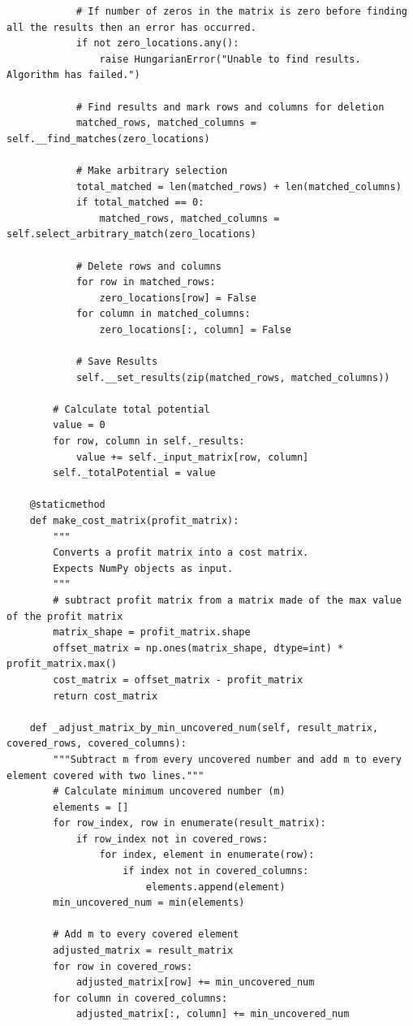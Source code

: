 \documentclass[12pt, letterpaper, twoside]{book}
\begin{document}
\begin{lstlisting}
            # If number of zeros in the matrix is zero before finding all the results then an error has occurred.
            if not zero_locations.any():
                raise HungarianError("Unable to find results. Algorithm has failed.")

            # Find results and mark rows and columns for deletion
            matched_rows, matched_columns = self.__find_matches(zero_locations)

            # Make arbitrary selection
            total_matched = len(matched_rows) + len(matched_columns)
            if total_matched == 0:
                matched_rows, matched_columns = self.select_arbitrary_match(zero_locations)

            # Delete rows and columns
            for row in matched_rows:
                zero_locations[row] = False
            for column in matched_columns:
                zero_locations[:, column] = False

            # Save Results
            self.__set_results(zip(matched_rows, matched_columns))

        # Calculate total potential
        value = 0
        for row, column in self._results:
            value += self._input_matrix[row, column]
        self._totalPotential = value

    @staticmethod
    def make_cost_matrix(profit_matrix):
        """
        Converts a profit matrix into a cost matrix.
        Expects NumPy objects as input.
        """
        # subtract profit matrix from a matrix made of the max value of the profit matrix
        matrix_shape = profit_matrix.shape
        offset_matrix = np.ones(matrix_shape, dtype=int) * profit_matrix.max()
        cost_matrix = offset_matrix - profit_matrix
        return cost_matrix

    def _adjust_matrix_by_min_uncovered_num(self, result_matrix, covered_rows, covered_columns):
        """Subtract m from every uncovered number and add m to every element covered with two lines."""
        # Calculate minimum uncovered number (m)
        elements = []
        for row_index, row in enumerate(result_matrix):
            if row_index not in covered_rows:
                for index, element in enumerate(row):
                    if index not in covered_columns:
                        elements.append(element)
        min_uncovered_num = min(elements)

        # Add m to every covered element
        adjusted_matrix = result_matrix
        for row in covered_rows:
            adjusted_matrix[row] += min_uncovered_num
        for column in covered_columns:
            adjusted_matrix[:, column] += min_uncovered_num


\end{lstlisting}
\end{document}
